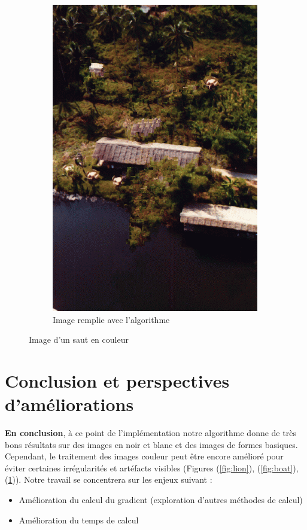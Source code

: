 \documentclass[9pt]{extarticle}
\begin{document}
\begin{figure}[!h]
\begin{subfigure}{0.3\textwidth}
        \includegraphics[width=\textwidth]{images/bungee_inpaint.png}
        \caption{Image remplie avec l'algorithme}
    \end{subfigure}
    \caption{Image d'un saut en couleur}
    \label{fig:jump}
\end{figure}

\newpage
\section{Conclusion et perspectives d'améliorations}
\textbf{En conclusion}, à ce point de l'implémentation notre algorithme donne de très bons résultats sur des images en noir et blanc et des images de formes basiques. Cependant, le traitement des images couleur peut être encore amélioré pour éviter certaines irrégularités et artéfacts visibles (Figures (\ref{fig:lion}), (\ref{fig:boat}), (\ref{fig:jump})). Notre travail se concentrera sur les enjeux suivant : \begin{itemize} \item Amélioration du calcul du gradient (exploration d'autres méthodes de calcul) \item Amélioration du temps de calcul \end{itemize}
\end{document}
